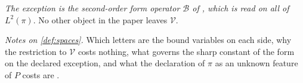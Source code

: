 \begin{definition}
\emph{The exception is the second-order form operator $\mathcal B$ of , which is read on
all of $L^{2}(\pi)$}. No other object in the paper leaves $\mathcal V$.
\end{definition}

\noindent\emph{Notes on \cref{def:spaces}.} Which letters are the bound variables on each side, why the
restriction to $\mathcal V$ costs nothing, what governs the sharp constant of the form on the declared
exception, and what the declaration of $\pi$ as an unknown feature of $P$ costs are
.


